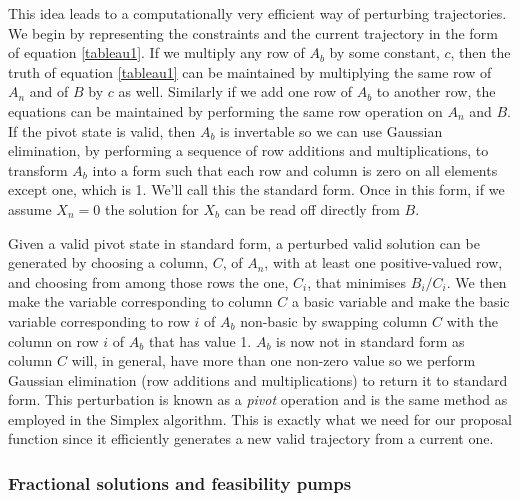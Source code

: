 \documentclass{article}
\begin{document}
This idea leads to a computationally very efficient way of perturbing trajectories. We begin by representing the constraints and the current trajectory in the form of equation \ref{tableau1}. If we multiply any row of $A_b$ by some constant, $c$, then the truth of equation \ref{tableau1} can be maintained by multiplying the same row of $A_n$ and of $B$ by $c$ as well. Similarly if we add one row of $A_b$ to another row, the equations can be maintained by performing the same row operation on $A_n$ and $B$. If the pivot state is valid, then $A_b$ is invertable so we can use Gaussian elimination, by performing a sequence of row additions and multiplications, to transform $A_b$ into a form such that each row and column is zero on all elements except one, which is 1. We'll call this the standard form. Once in this form, if we assume $X_n = 0$ the solution for $X_b$ can be read off directly from $B$.

Given a valid pivot state in standard form, a perturbed valid solution can be generated by choosing a column, $C$, of $A_n$, with at least one positive-valued row, and choosing from among those rows the one, $C_i$, that minimises $B_i/C_i$. We then make the variable corresponding to column $C$ a basic variable and make the basic variable corresponding to row $i$ of $A_b$ non-basic by swapping column $C$ with the column on row $i$ of $A_b$ that has value 1. $A_b$ is now not in standard form as column $C$ will, in general, have more than one non-zero value so we perform Gaussian elimination (row additions and multiplications) to return it to standard form. This perturbation is known as a \textit{pivot} operation and is the same method as employed in the Simplex algorithm\cite{dantzig1955generalized}\cite{vanderbei2015linear}. This is exactly what we need for our proposal function since it efficiently generates a new valid trajectory from a current one.

\subsubsection{Fractional solutions and feasibility pumps}
\end{document}
